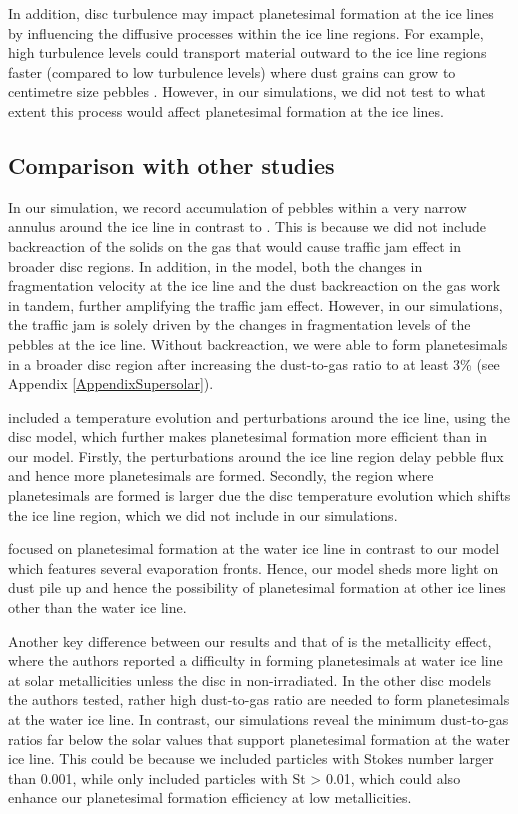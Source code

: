 \documentclass{aa}
\begin{document}
In addition, disc turbulence may impact planetesimal formation at the ice lines by influencing the diffusive processes within the ice line regions. For example, high turbulence levels could transport material outward to the ice line regions faster (compared to low turbulence levels) where dust grains can grow to centimetre size pebbles \citep{Ros2013, Ros2019}. However, in our simulations, we did not test to what extent this process would affect planetesimal formation at the ice lines.

\subsection{Comparison with other studies}

In our simulation, we record accumulation of pebbles within a very narrow annulus around the ice line in contrast to \citet{DrazkowskaAlibert2017}. This is because we did not include backreaction of the solids on the gas that would cause traffic jam effect in broader disc regions. In addition, in the \citet{DrazkowskaAlibert2017} model, both the changes in fragmentation velocity at the ice line and the dust backreaction on the gas work in tandem, further amplifying the traffic jam effect. However, in our simulations, the traffic jam is solely driven by the changes in fragmentation levels of the pebbles at the ice line. Without backreaction, we were able to  form planetesimals in a broader disc region after increasing the dust-to-gas ratio to at least 3\% (see Appendix \ref{AppendixSupersolar}).

\citet{DrazkowskaAlibert2017} included a temperature evolution and perturbations around the ice line, using the \cite{Bitsch2015a} disc model, which further makes planetesimal formation more efficient than in our model. Firstly, the perturbations around the ice line region delay pebble flux and hence more planetesimals are formed. Secondly, the region where planetesimals are formed is larger due the disc temperature evolution which shifts the ice line region, which we did not include in our simulations.

\citet{DrazkowskaAlibert2017} focused on planetesimal formation at the water ice line in contrast to our model which features several evaporation fronts. Hence, our model sheds more light on dust pile up and hence the possibility of planetesimal formation at other ice lines other than the water ice line. 

Another key difference between our results and that of \citet{DrazkowskaAlibert2017} is the metallicity effect, where the authors reported a difficulty in forming planetesimals at water ice line at solar metallicities unless the disc in non-irradiated. In the other disc models the authors tested, rather high dust-to-gas ratio are needed to form planetesimals at the water ice line. In contrast, our simulations reveal the minimum dust-to-gas ratios far below the solar values that support planetesimal formation at the water ice line.
This could be because we included particles with Stokes number larger than 0.001, while \citep{DrazkowskaAlibert2017} only included particles with St > 0.01, which could also enhance our planetesimal formation efficiency at low metallicities.
\end{document}
